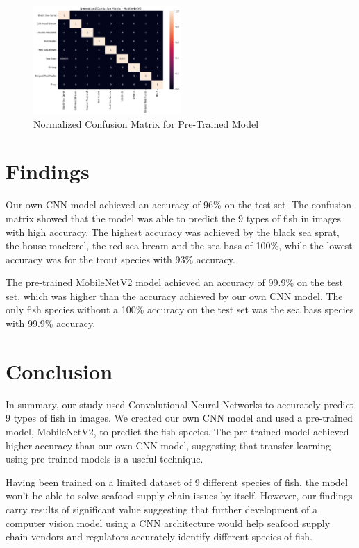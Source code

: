 \documentclass[a4paper, twocolumn]{article}
\begin{document}
\begin{figure}[h]
\centering
\includegraphics[width=0.5\textwidth]{figures/confusion_matrix_pretrained.png}
\caption{Normalized Confusion Matrix for Pre-Trained Model}
\label{fig:example}
\end{figure}

\section{Findings}\label{sec: Findings}
Our own CNN model achieved an accuracy of 96\% on the test set. The confusion matrix showed that the model was able to predict the 9 types of fish in images with high accuracy. The highest accuracy was achieved by the black sea sprat, the house mackerel, the red sea bream and the sea bass of 100\%, while the lowest accuracy was for the trout species with 93\% accuracy.

The pre-trained MobileNetV2 model achieved an accuracy of 99.9\% on the test set, which was higher than the accuracy achieved by our own CNN model. The only fish species without a 100\% accuracy on the test set was the sea bass species with 99.9\% accuracy.


\section{Conclusion}\label{sec: Conclusion}
In summary, our study used Convolutional Neural Networks to accurately predict 9 types of fish in images. We created our own CNN model and used a pre-trained model, MobileNetV2, to predict the fish species. The pre-trained model achieved higher accuracy than our own CNN model, suggesting that transfer learning using pre-trained models is a useful technique.

Having been trained on a limited dataset of 9 different species of fish, the model won't be able to solve seafood supply chain issues by itself. However, our findings carry results of significant value suggesting that further development of a computer vision model using a CNN architecture would help seafood supply chain vendors and regulators accurately identify different species of fish.

\printbibliography
\end{document}
